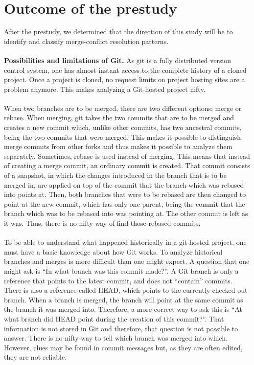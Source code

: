 \section{Outcome of the prestudy}
After the prestudy, we determined that the direction of this study will be to identify and classify merge-conflict resolution patterns.
\paragraph*{}
\textbf{Possibilities and limitations of Git.} As git is a fully distributed version control system, one has almost instant access to the complete history of a cloned project. Once a project is cloned, no request limits on project hosting sites are a problem anymore. This makes analyzing a Git-hosted project nifty.
\paragraph*{}
When two branches are to be merged, there are two different options: merge or rebase. When merging, git takes the two commits that are to be merged and creates a new commit which, unlike other commits, has two ancestral commits, being the two commits that were merged. This makes it possible to distinguish merge commits from other forks and thus makes it possible to analyze them separately. Sometimes, rebase is used instead of merging. This means that instead of creating a merge commit, an ordinary commit is created. That commit consists of a snapshot, in which the changes introduced in the branch that is to be merged in, are applied on top of the commit that the branch which was rebased into points at. Then, both branches that were to be rebased are then changed to point at the new commit, which has only one parent, being the commit that the branch which was to be rebased into was pointing at. The other commit is left as it was. Thus, there is no nifty way of find those rebased commits.
\paragraph*{}
To be able to understand what happened historically in a git-hosted project, one must have a basic knowledge about how Git works. To analyze historical branches and merges is more difficult than one might expect. A question that one might ask is “In what branch was this commit made?”. A Git branch is only a reference that points to the latest commit, and does not “contain” commits. There is also a reference called HEAD, which points to the currently checked out branch. When a branch is merged, the branch will point at the same commit as the branch it was merged into. Therefore, a more correct way to ask this is “At what branch did HEAD point during the creation of this commit?”. That information is not stored in Git and therefore, that question is not possible to answer. There is no nifty way to tell which branch was merged into which. However, clues may be found in commit messages but, as they are often edited, they are not reliable.
